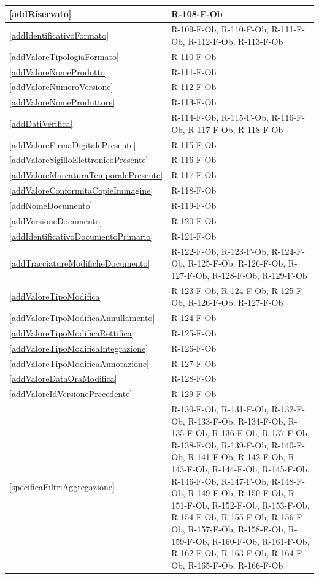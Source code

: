 \begin{longtable}{|p{4cm}|p{10cm}|}
\hline
\ref{addRiservato} & R-108-F-Ob \\
\hline
\ref{addIdentificativoFormato} & R-109-F-Ob, R-110-F-Ob, R-111-F-Ob, R-112-F-Ob, R-113-F-Ob \\
\hline
\ref{addValoreTipologiaFormato} & R-110-F-Ob \\
\hline
\ref{addValoreNomeProdotto} & R-111-F-Ob \\
\hline
\ref{addValoreNumeroVersione} & R-112-F-Ob \\
\hline
\ref{addValoreNomeProduttore} & R-113-F-Ob \\
\hline
\ref{addDatiVerifica} & R-114-F-Ob, R-115-F-Ob, R-116-F-Ob, R-117-F-Ob, R-118-F-Ob \\
\hline
\ref{addValoreFirmaDigitalePresente} & R-115-F-Ob \\
\hline
\ref{addValoreSigilloElettronicoPresente} & R-116-F-Ob \\
\hline
\ref{addValoreMarcaturaTemporalePresente} & R-117-F-Ob \\
\hline
\ref{addValoreConformitaCopieImmagine} & R-118-F-Ob \\
\hline
\ref{addNomeDocumento} & R-119-F-Ob \\
\hline
\ref{addVersioneDocumento} & R-120-F-Ob \\
\hline
\ref{addIdentificativoDocumentoPrimario} & R-121-F-Ob \\
\hline
\ref{addTracciatureModificheDocumento} & R-122-F-Ob, R-123-F-Ob, R-124-F-Ob, R-125-F-Ob, R-126-F-Ob, R-127-F-Ob, R-128-F-Ob, R-129-F-Ob \\
\hline
\ref{addValoreTipoModifica} & R-123-F-Ob, R-124-F-Ob, R-125-F-Ob, R-126-F-Ob, R-127-F-Ob \\
\hline
\ref{addValoreTipoModificaAnnullamento} & R-124-F-Ob \\
\hline
\ref{addValoreTipoModificaRettifica} & R-125-F-Ob \\
\hline
\ref{addValoreTipoModificaIntegrazione} & R-126-F-Ob \\
\hline
\ref{addValoreTipoModificaAnnotazione} & R-127-F-Ob \\
\hline
\ref{addValoreDataOraModifica} & R-128-F-Ob \\
\hline
\ref{addValoreIdVersionePrecedente} & R-129-F-Ob \\
\hline
\ref{specificaFiltriAggregazione} & R-130-F-Ob, R-131-F-Ob, R-132-F-Ob, R-133-F-Ob, R-134-F-Ob, R-135-F-Ob, R-136-F-Ob, R-137-F-Ob, R-138-F-Ob, R-139-F-Ob, R-140-F-Ob, R-141-F-Ob, R-142-F-Ob, R-143-F-Ob, R-144-F-Ob, R-145-F-Ob, R-146-F-Ob, R-147-F-Ob, R-148-F-Ob, R-149-F-Ob, R-150-F-Ob, R-151-F-Ob, R-152-F-Ob, R-153-F-Ob, R-154-F-Ob, R-155-F-Ob, R-156-F-Ob, R-157-F-Ob, R-158-F-Ob, R-159-F-Ob, R-160-F-Ob, R-161-F-Ob, R-162-F-Ob, R-163-F-Ob, R-164-F-Ob, R-165-F-Ob, R-166-F-Ob \\

\end{longtable}
